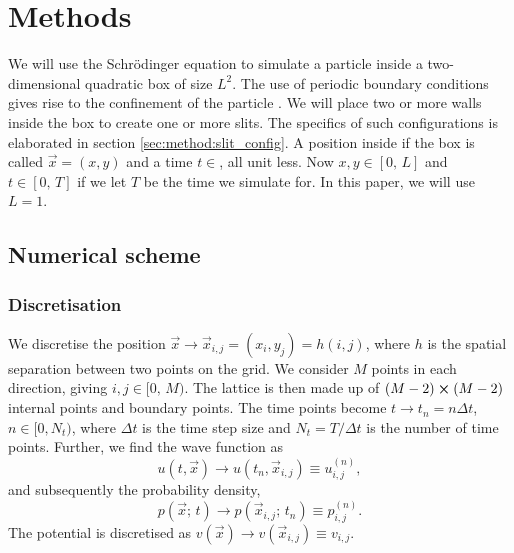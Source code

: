 
\section{Methods}\label{sec:methods}

We will use the Schrödinger equation to simulate a particle inside a two-dimensional quadratic box of size $L^2$. The use of periodic boundary conditions gives rise to the confinement of the particle . We will place two or more walls inside the box to create one or more slits. The specifics of such configurations is elaborated in section \ref{sec:method:slit_config}. A position inside if the box is called $\vec{x} =(x, y)$ and a time $t\in$, all unit less. Now $x, y \in [0,\,L]$ and $t\in[0,\,T]$ if we let $T$ be the time we simulate for. In this paper, we will use $L=1$.

\subsection{Numerical scheme}


    \subsubsection{Discretisation}
        We discretise the position $\vec{x} \to \vec{x}_{i,j} = (x_i, y_j) = h(i,j)$, where $h$ is the spatial separation between two points on the grid. We consider $M$ points in each direction, giving $i, j \in [0,\, M)$. The lattice is then made up of $(M-2) \cross (M-2)$ internal points and boundary points. The time points become $t\to t_n=n\Delta t$, $n\in[0, N_t)$, where $\Delta t$ is the time step size and $N_t = T/\Delta t$ is the number of time points. Further, we find the wave function as
        \begin{equation}
            u(t, \vec{x}) \to u(t_n, \vec{x}_{i,j}) \equiv u_{i,j}^{(n)},
        \end{equation}
        and subsequently the probability density,
        \begin{equation}
            p(\vec{x};\, t) \to p(\vec{x}_{i,j};\, t_n) \equiv p_{i,j}^{(n)}.
        \end{equation}
        The potential is discretised as $v(\vec{x}) \to v(\vec{x}_{i,j})\equiv v_{i,j}$. 

